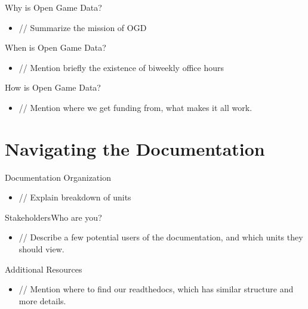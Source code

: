 \documentclass{beamer}
\begin{document}
\begin{frame}{Why is Open Game Data?}
  \begin{itemize}
  \item
    // Summarize the mission of OGD
    \pause
  \end{itemize}
\end{frame}

\begin{frame}{When is Open Game Data?}
  \begin{itemize}
  \item
    // Mention briefly the existence of biweekly office hours
    \pause
  \end{itemize}
\end{frame}

\begin{frame}{How is Open Game Data?}
  \begin{itemize}
  \item
    // Mention where we get funding from, what makes it all work.
    \pause
  \end{itemize}
\end{frame}

\section[Documentation]{Navigating the Documentation}

\begin{frame}{Documentation Organization}
  \begin{itemize}
  \item
    // Explain breakdown of units
    \pause
  \end{itemize}
\end{frame}

\begin{frame}{Stakeholders}{Who are you?}
  \begin{itemize}
  \item
    // Describe a few potential users of the documentation,
    and which units they should view.
    \pause
  \end{itemize}
\end{frame}

\begin{frame}{Additional Resources}
  \begin{itemize}
  \item
    // Mention where to find our readthedocs, which has similar structure and more details.
    \pause
  \end{itemize}
\end{frame}
\end{document}
